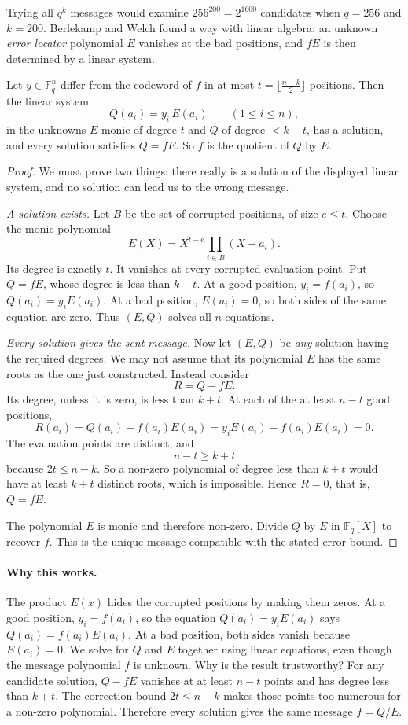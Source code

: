 Trying all $q^k$ messages would examine $256^{200}=2^{1600}$ candidates
when $q=256$ and $k=200$. Berlekamp and Welch found a way with linear
algebra: an unknown \emph{error locator} polynomial $E$ vanishes at the
bad positions, and $fE$ is then determined by a linear system.

\begin{theorem}\label{thm:bw}
Let $y\in\mathbb F_q^n$ differ from the codeword of $f$ in at most $t=\lfloor\frac{n-k}2\rfloor$ positions. Then the linear system
\[
Q(a_i)=y_i\,E(a_i)\qquad(1\le i\le n),
\]
in the unknowns $E$ monic of degree $t$ and $Q$ of degree $<k+t$, has a solution, and every solution satisfies $Q=fE$. So $f$ is the quotient of $Q$ by $E$.
\end{theorem}
\begin{proof}
We must prove two things: there really is a solution of the displayed linear system, and no solution can lead us to the wrong message.

\emph{A solution exists.} Let $B$ be the set of corrupted positions, of size $e\le t$. Choose the monic polynomial
\[
E(X)=X^{t-e}\prod_{i\in B}(X-a_i).
\]
Its degree is exactly $t$. It vanishes at every corrupted evaluation point. Put $Q=fE$, whose degree is less than $k+t$. At a good position, $y_i=f(a_i)$, so $Q(a_i)=y_iE(a_i)$. At a bad position, $E(a_i)=0$, so both sides of the same equation are zero. Thus $(E,Q)$ solves all $n$ equations.

\emph{Every solution gives the sent message.} Now let $(E,Q)$ be \emph{any} solution having the required degrees. We may not assume that its polynomial $E$ has the same roots as the one just constructed. Instead consider
\[
R=Q-fE.
\]
Its degree, unless it is zero, is less than $k+t$. At each of the at least $n-t$ good positions,
\[
R(a_i)=Q(a_i)-f(a_i)E(a_i)
      =y_iE(a_i)-f(a_i)E(a_i)=0.
\]
The evaluation points are distinct, and
\[
n-t\ge k+t
\]
because $2t\le n-k$. So a non-zero polynomial of degree less than $k+t$ would have at least $k+t$ distinct roots, which is impossible. Hence $R=0$, that is, $Q=fE$.

The polynomial $E$ is monic and therefore non-zero. Divide $Q$ by $E$ in $\mathbb F_q[X]$ to recover $f$. This is the unique message compatible with the stated error bound.
\end{proof}

\paragraph{Why this works.}
The product $E(x)$ hides the corrupted positions by making them zeros. At a good position, $y_i=f(a_i)$, so the equation $Q(a_i)=y_iE(a_i)$ says $Q(a_i)=f(a_i)E(a_i)$. At a bad position, both sides vanish because $E(a_i)=0$. We solve for $Q$ and $E$ together using linear equations, even though the message polynomial $f$ is unknown. Why is the result trustworthy? For any candidate solution, $Q-fE$ vanishes at at least $n-t$ points and has degree less than $k+t$. The correction bound $2t\le n-k$ makes those points too numerous for a non-zero polynomial. Therefore every solution gives the same message $f=Q/E$.


